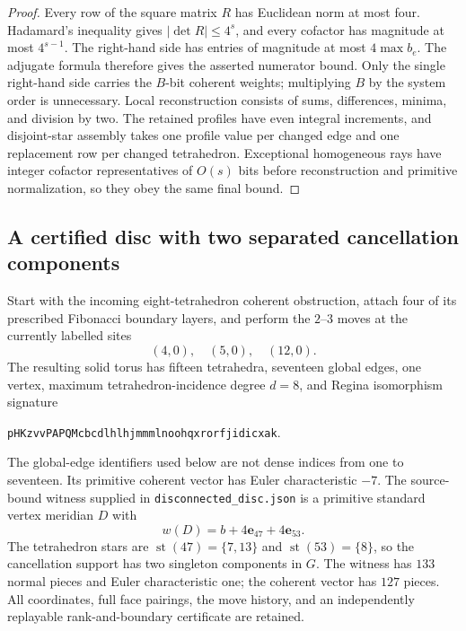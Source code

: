 \begin{proof}
Every row of the square matrix $R$ has Euclidean norm at most four.
Hadamard's inequality gives $|\det R|\le4^s$, and every cofactor has
magnitude at most $4^{s-1}$.  The right-hand side has entries of
magnitude at most $4\max b_e$.  The adjugate formula therefore gives
the asserted numerator bound.  Only the single right-hand side carries
the $B$-bit coherent weights; multiplying $B$ by the system order is
unnecessary.  Local reconstruction consists of sums, differences,
minima, and division by two.  The retained profiles have even integral
increments, and disjoint-star assembly takes one profile value per
changed edge and one replacement row per changed tetrahedron.
Exceptional homogeneous rays have integer cofactor representatives of
$O(s)$ bits before reconstruction and primitive normalization, so they
obey the same final bound.
\end{proof}

\subsection{A certified disc with two separated cancellation components}
\label{sec:cluster-counterexample}

Start with the incoming eight-tetrahedron coherent obstruction, attach
four of its prescribed Fibonacci boundary layers, and perform the
$2$--$3$ moves at the currently labelled sites
\[
                        (4,0),\quad(5,0),\quad(12,0).
\]
The resulting solid torus has fifteen tetrahedra, seventeen global edges,
one vertex, maximum tetrahedron-incidence degree $d=8$, and Regina
isomorphism signature
\begin{center}\texttt{pHKzvvPAPQMcbcdlhlhjmmmlnoohqxrorfjidicxak}.\end{center}
The global-edge identifiers used below are not dense indices from one to
seventeen. Its primitive coherent vector has Euler characteristic $-7$.  The
source-bound witness supplied in \texttt{disconnected\_disc.json} is a
primitive standard vertex meridian $D$ with
\[
                 w(D)=b+4\mathbf e_{47}+4\mathbf e_{53}.
\]
The tetrahedron stars are $\operatorname{st}(47)=\{7,13\}$ and
$\operatorname{st}(53)=\{8\}$, so the cancellation support has two
singleton components in $G$.  The witness has $133$ normal pieces and
Euler characteristic one; the coherent vector has $127$ pieces.  All
coordinates, full face pairings, the move history, and an independently
replayable rank-and-boundary certificate are retained.

